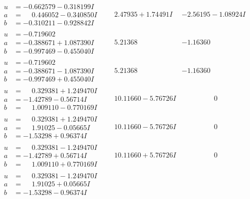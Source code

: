 \documentclass[1p]{elsarticle_modified}
\theoremstyle{definition}
\begin{document}
$$\begin{array}{c|c|c}
\begin{aligned}
u &= -0.662579 - 0.318199 I \\
a &= \phantom{-}0.446052 - 0.340850 I \\
b &= -0.310211 - 0.928842 I\end{aligned}
 & \phantom{-}2.47935 + 1.74491 I & -2.56195 - 1.08924 I \\ \hline\begin{aligned}
u &= -0.719602\phantom{ +0.000000I} \\
a &= -0.388671 + 1.087390 I \\
b &= -0.997469 - 0.455040 I\end{aligned}
 & \phantom{-}5.21368\phantom{ +0.000000I} & -1.16360\phantom{ +0.000000I} \\ \hline\begin{aligned}
u &= -0.719602\phantom{ +0.000000I} \\
a &= -0.388671 - 1.087390 I \\
b &= -0.997469 + 0.455040 I\end{aligned}
 & \phantom{-}5.21368\phantom{ +0.000000I} & -1.16360\phantom{ +0.000000I} \\ \hline\begin{aligned}
u &= \phantom{-}0.329381 + 1.249470 I \\
a &= -1.42789 - 0.56714 I \\
b &= \phantom{-}1.009110 - 0.770169 I\end{aligned}
 & \phantom{-}10.11660 - 5.76726 I & \phantom{-0.000000 } 0 \\ \hline\begin{aligned}
u &= \phantom{-}0.329381 + 1.249470 I \\
a &= \phantom{-}1.91025 - 0.05665 I \\
b &= -1.53298 + 0.96374 I\end{aligned}
 & \phantom{-}10.11660 - 5.76726 I & \phantom{-0.000000 } 0 \\ \hline\begin{aligned}
u &= \phantom{-}0.329381 - 1.249470 I \\
a &= -1.42789 + 0.56714 I \\
b &= \phantom{-}1.009110 + 0.770169 I\end{aligned}
 & \phantom{-}10.11660 + 5.76726 I & \phantom{-0.000000 } 0 \\ \hline\begin{aligned}
u &= \phantom{-}0.329381 - 1.249470 I \\
a &= \phantom{-}1.91025 + 0.05665 I \\
b &= -1.53298 - 0.96374 I\end{aligned}

\end{array}$$
\end{document}
